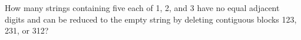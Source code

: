 How many strings containing five each of 1, 2, and 3 have no equal adjacent digits and can be reduced to the empty string by deleting contiguous blocks 123, 231, or 312?
